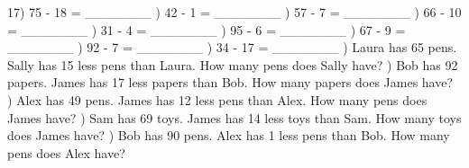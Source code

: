 \documentclass{article}%
\begin{document}
17) 75 {-} 18 = \_\_\_\_\_\_\_%
\newline%
\newline%
) 42 {-} 1 = \_\_\_\_\_\_\_%
\newline%
\newline%
) 57 {-} 7 = \_\_\_\_\_\_\_%
\newline%
\newline%
) 66 {-} 10 = \_\_\_\_\_\_\_%
\newline%
\newline%
) 31 {-} 4 = \_\_\_\_\_\_\_%
\newline%
\newline%
) 95 {-} 6 = \_\_\_\_\_\_\_%
\newline%
\newline%
) 67 {-} 9 = \_\_\_\_\_\_\_%
\newline%
\newline%
) 92 {-} 7 = \_\_\_\_\_\_\_%
\newline%
\newline%
) 34 {-} 17 = \_\_\_\_\_\_\_%
\newline%
\newline%
) Laura has 65 pens. Sally has 15 less pens than Laura. How many pens does Sally have?%
\newline%
\newline%
) Bob has 92 papers. James has 17 less papers than Bob. How many papers does James have?%
\newline%
\newline%
) Alex has 49 pens. James has 12 less pens than Alex. How many pens does James have?%
\newline%
\newline%
) Sam has 69 toys. James has 14 less toys than Sam. How many toys does James have?%
\newline%
\newline%
) Bob has 90 pens. Alex has 1 less pens than Bob. How many pens does Alex have?%
\end{document}
